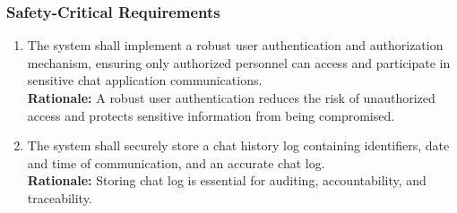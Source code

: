\documentclass[]{article}
\begin{document}
\subsubsection{Safety-Critical Requirements}
\label{ssub:safety_critical_requirements}
\begin{enumerate}[{PR-SC}1. ]
	\item The system shall implement a robust user authentication and authorization mechanism, ensuring only authorized
	      personnel can access and participate in sensitive chat application communications. \\
	      {\bf Rationale:} A robust user authentication reduces the risk of unauthorized access and protects sensitive information
	      from being compromised.
	\item The system shall securely store a chat history log containing identifiers, date and time of communication, and an accurate chat log.\\
	      {\bf Rationale:} Storing chat log is essential for auditing, accountability, and traceability. \\
\end{enumerate}
\end{document}
